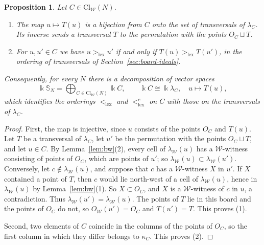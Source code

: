 \documentclass[11pt]{amsart}
\newtheorem{proposition}[theorem]{Proposition}
\theoremstyle{definition}
\theoremstyle{remark}
\newcommand{\bS}{\mathbb{S}}
\newcommand{\kk}{\Bbbk}
\newcommand{\Cl}{\mathrm{Cl}}
\newcommand{\cW}{\mathcal{W}}
\newcommand{\lex}{\mathrm{lex}}
\begin{document}
\begin{proposition}\label{prop:classes}
Let $C\in\Cl_\cW(N)$.
\begin{enumerate}
\item The map $u\mapsto T(u)$ is a bijection from $C$ onto the set of transversals of $\lambda_C$. Its inverse sends a transversal $T$ to the permutation with the points $O_C\sqcup T$.
\item For $u,u'\in C$ we have $u>_\lex u'$ if and only if $T(u)>_\lex T(u')$, in the ordering of transversals of Section~\ref{sec:board-ideals}.
\end{enumerate}
Consequently, for every $N$ there is a decomposition of vector spaces
\begin{equation}\label{eq:class-dec}
\kk\bS_N=\bigoplus_{C\in\Cl_\cW(N)}\kk C,\qquad\kk C\cong\kk\lambda_C,\quad u\mapsto T(u),
\end{equation}
which identifies the orderings $<_\lex$ and $<_\lex^c$ on $C$ with those on the transversals of $\lambda_C$.
\end{proposition}

\begin{proof}
First, the map is injective, since $u$ consists of the points $O_C$ and $T(u)$. Let $T$ be a transversal of $\lambda_C$, let $u'$ be the permutation with the points $O_C\sqcup T$, and let $u\in C$. By Lemma~\ref{lem:bw}(2), every cell of $\lambda_\cW(u)$ has a $\cW$-witness consisting of points of $O_C$, which are points of $u'$; so $\lambda_\cW(u)\subset\lambda_\cW(u')$. Conversely, let $c\notin\lambda_\cW(u)$, and suppose that $c$ has a $\cW$-witness $X$ in $u'$. If $X$ contained a point of $T$, then $c$ would lie north-west of a cell of $\lambda_\cW(u)$, hence in $\lambda_\cW(u)$ by Lemma~\ref{lem:bw}(1). So $X\subset O_C$, and $X$ is a $\cW$-witness of $c$ in $u$, a contradiction. Thus $\lambda_\cW(u')=\lambda_\cW(u)$. The points of $T$ lie in this board and the points of $O_C$ do not, so $O_\cW(u')=O_C$ and $T(u')=T$. This proves (1).

Second, two elements of $C$ coincide in the columns of the points of $O_C$, so the first column in which they differ belongs to $\kappa_C$. This proves (2).
\end{proof}
\end{document}
